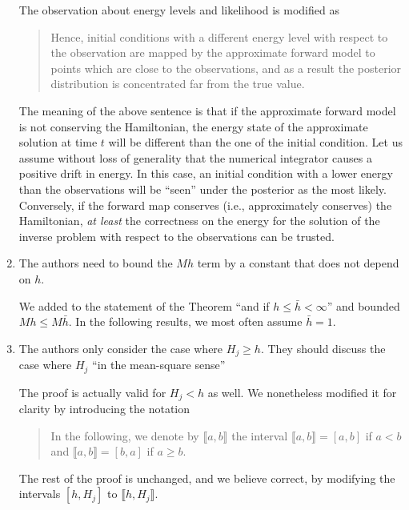 \documentclass[10pt]{article}
\begin{document}
\begin{enumerate}
\begin{quote}
	\end{quote}
	The observation about energy levels and likelihood is modified as
	\begin{quote}
		Hence, initial conditions with a different energy level with respect to the observation are mapped by the approximate forward model to points which are close to the observations, and as a result the posterior distribution is concentrated far from the true value.
	\end{quote} 
	The meaning of the above sentence is that if the approximate forward model is not conserving the Hamiltonian, the energy state of the approximate solution at time $t$ will be different than the one of the initial condition. Let us assume without loss of generality that the numerical integrator causes a positive drift in energy. In this case, an initial condition with a lower energy than the observations will be ``seen'' under the posterior as the most likely. Conversely, if the forward map conserves (i.e., approximately conserves) the Hamiltonian, \textit{at least} the correctness on the energy for the solution of the inverse problem with respect to the observations can be trusted.
	\item 
	\begin{itquote}
		{} The authors need to bound the $Mh$ term by a constant that does not depend on $h$.
	\end{itquote}
	We added to the statement of the Theorem ``and if $h \leq \bar h < \infty$'' and bounded $Mh \leq M\bar h$. In the following results, we most often assume $\bar h = 1$.
	\item 
	\begin{itquote}
		 {} The authors only consider the case where $H_j\geq h$. They should discuss the case where $H_j$ ``in the mean-square sense''
	\end{itquote}
	The proof is actually valid for $H_j < h$ as well. We nonetheless modified it for clarity by introducing the notation
	\begin{quote}
		In the following, we denote by $\llbracket a, b \rrbracket$ the interval $\llbracket a, b \rrbracket = [a, b]$ if $a < b$ and $\llbracket a, b \rrbracket = [b, a]$ if $a \geq b$.
	\end{quote}
	The rest of the proof is unchanged, and we believe correct, by modifying the intervals $[h, H_j]$ to $\llbracket h, H_j \rrbracket$.
\end{enumerate}
\end{document}
